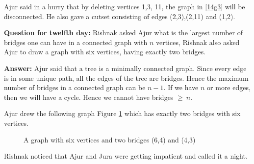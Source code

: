 Ajur said in a hurry that by deleting vertices 1,3, 11, the graph in \ref{14g3} will be disconnected. He
also gave a cutset consisting of edges (2,3),(2,11) and (1,2).

\textbf{Question for twelfth day:} Rishnak asked Ajur what is the largest number of bridges one can have in a connected graph with $n$ vertices, Rishnak also asked Ajur to draw a graph with six vertices, having exactly two bridges.

\textbf{Answer:} Ajur said that a tree is a minimally connected graph. Since every edge is in some unique path, all the edges of the tree are bridges. Hence the maximum number of bridges in a connected graph can be $n-1$. If we have $n$ or more edges, then we will have a cycle. Hence we cannot have bridges $\ge~n$.

Ajur drew the following graph Figure \ref{14ag1} which has exactly two bridges with six vertices.

\begin{figure}
\begin{center}
\caption{A graph with six vertices and two bridges (6,4) and (4,3)}\label{14ag1}
\end{center}
\end{figure}


Rishnak noticed that Ajur and Jura were getting impatient and called it a night.